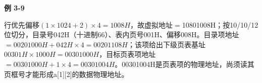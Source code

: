{\color{ink}\bfseries 例 3-9}\par\vspace{1bp}行优先偏移\((1\times 1024+\allowbreak{}2)\times 4=\allowbreak{}1008H\)，故虚拟地址\(=\allowbreak{}\)10801008H；按10/\allowbreak{}10/\allowbreak{}12位切分，目录号042H（十进制66）、表内页号001H、偏移008H。目录项地址\(=\allowbreak{}00201000H+\allowbreak{}042H\times 4=\allowbreak{}00201108H\)；该项给出下级页表基址\(00301H\times 1000H=\allowbreak{}00301000H\)，目标页表项地址\(=\allowbreak{}00301000H+\allowbreak{}1\times 4=\allowbreak{}00301004H\)。00301004H是页表项的物理地址，尚须读其页框号才能形成a[1][2]的数据物理地址。
